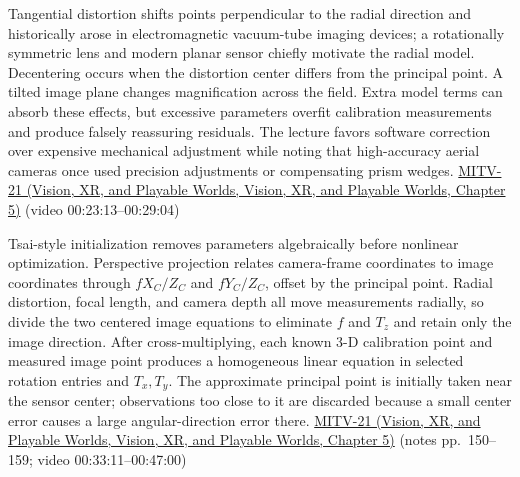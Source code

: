 Tangential distortion shifts points perpendicular to the radial direction and historically arose in electromagnetic vacuum-tube imaging devices; a rotationally symmetric lens and modern planar sensor chiefly motivate the radial model. Decentering occurs when the distortion center differs from the principal point. A tilted image plane changes magnification across the field. Extra model terms can absorb these effects, but excessive parameters overfit calibration measurements and produce falsely reassuring residuals. The lecture favors software correction over expensive mechanical adjustment while noting that high-accuracy aerial cameras once used precision adjustments or compensating prism wedges. \href{../07-Vision-XR-and-Playable-Worlds/main.pdf\#nameddest=04-visual-computing-ii-ch036-mitv-21---relative-orientation-binocular-stereo-structure-quadrics-calibration-reprojection}{MITV-21 (Vision, XR, and Playable Worlds, Vision, XR, and Playable Worlds, Chapter 5)} (video 00:23:13--00:29:04)

Tsai-style initialization removes parameters algebraically before nonlinear optimization. Perspective projection relates camera-frame coordinates to image coordinates through \(fX_C/Z_C\) and \(fY_C/Z_C\), offset by the principal point. Radial distortion, focal length, and camera depth all move measurements radially, so divide the two centered image equations to eliminate \(f\) and \(T_z\) and retain only the image direction. After cross-multiplying, each known 3-D calibration point and measured image point produces a homogeneous linear equation in selected rotation entries and \(T_x,T_y\). The approximate principal point is initially taken near the sensor center; observations too close to it are discarded because a small center error causes a large angular-direction error there. \href{../07-Vision-XR-and-Playable-Worlds/main.pdf\#nameddest=04-visual-computing-ii-ch036-mitv-21---relative-orientation-binocular-stereo-structure-quadrics-calibration-reprojection}{MITV-21 (Vision, XR, and Playable Worlds, Vision, XR, and Playable Worlds, Chapter 5)} (notes pp.~150--159; video 00:33:11--00:47:00)

